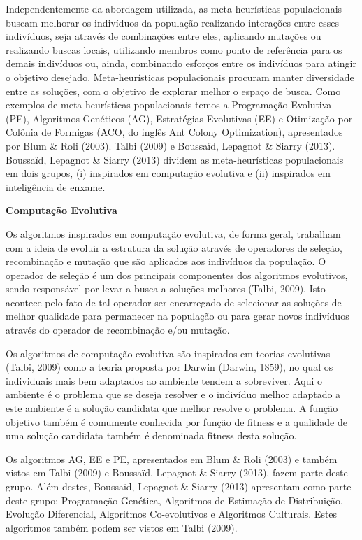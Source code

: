 Independentemente da abordagem utilizada, as meta-heurísticas populacionais buscam melhorar os indivíduos da população realizando interações entre esses indivíduos, seja através de combinações entre eles, aplicando mutações ou realizando buscas locais, utilizando membros como ponto de referência para os demais indivíduos ou, ainda, combinando esforços entre os indivíduos para atingir o objetivo desejado. Meta-heurísticas populacionais procuram manter diversidade entre as soluções, com o objetivo de explorar melhor o espaço de busca. Como exemplos de meta-heurísticas populacionais temos a Programação Evolutiva (PE), Algoritmos Genéticos (AG), Estratégias Evolutivas (EE) e Otimização por Colônia de Formigas (ACO, do inglês Ant Colony Optimization), apresentados por Blum \& Roli (2003). Talbi (2009) e Boussaïd, Lepagnot \& Siarry (2013). Boussaïd, Lepagnot \& Siarry (2013) dividem as meta-heurísticas populacionais em dois grupos, (i) inspirados em computação evolutiva e (ii) inspirados em inteligência de enxame. 

\textbf{Computação Evolutiva}

Os algoritmos inspirados em computação evolutiva, de forma geral, trabalham com a ideia de evoluir a estrutura da solução através de operadores de seleção, recombinação e mutação que são aplicados aos indivíduos da população. O operador de seleção é um dos principais componentes dos algoritmos evolutivos, sendo responsável por levar a busca a soluções melhores (Talbi, 2009). Isto acontece pelo fato de tal operador ser encarregado de selecionar as soluções de melhor qualidade para permanecer na população ou para gerar novos indivíduos através do operador de recombinação e/ou mutação. 

Os algoritmos de computação evolutiva são inspirados em teorias evolutivas (Talbi, 2009) como a teoria proposta por Darwin (Darwin, 1859), no qual os individuais mais bem adaptados ao ambiente tendem a sobreviver. Aqui o ambiente é o problema que se deseja resolver e o indivíduo melhor adaptado a este ambiente é a solução candidata que melhor resolve o problema. A função objetivo também é comumente conhecida por função de fitness e a qualidade de uma solução candidata também é denominada fitness desta solução.

Os algoritmos AG, EE e PE, apresentados em Blum \& Roli (2003) e também vistos em Talbi (2009) e Boussaïd, Lepagnot \& Siarry (2013), fazem parte deste grupo. Além destes, Boussaïd, Lepagnot \& Siarry (2013) apresentam como parte deste grupo: Programação Genética, Algoritmos de Estimação de Distribuição, Evolução Diferencial, Algoritmos Co-evolutivos e Algoritmos Culturais. Estes algoritmos também podem ser vistos em Talbi (2009). 

